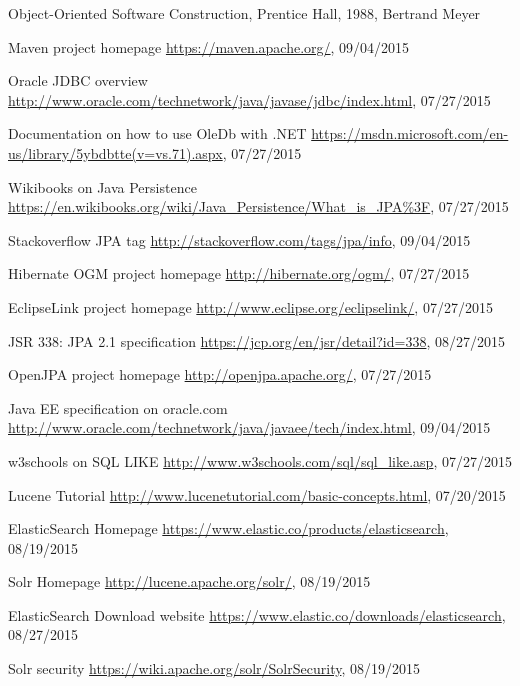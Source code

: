 \begin{thebibliography}{100}
	 Object-Oriented Software Construction, Prentice Hall, 1988, Bertrand Meyer

	 Maven project homepage
	\url{https://maven.apache.org/}, 09/04/2015

	 Oracle JDBC overview
	\url{http://www.oracle.com/technetwork/java/javase/jdbc/index.html}, 07/27/2015

	 Documentation on how to use OleDb with .NET
	\url{https://msdn.microsoft.com/en-us/library/5ybdbtte(v=vs.71).aspx}, 07/27/2015

	 Wikibooks on Java Persistence
	\url{https://en.wikibooks.org/wiki/Java_Persistence/What_is_JPA\%3F}, 07/27/2015

	 Stackoverflow JPA tag
	\url{http://stackoverflow.com/tags/jpa/info}, 09/04/2015

	 Hibernate OGM project homepage
	\url{http://hibernate.org/ogm/}, 07/27/2015

	 EclipseLink project homepage
	\url{http://www.eclipse.org/eclipselink/}, 07/27/2015

	 JSR 338: JPA 2.1 specification
	\url{https://jcp.org/en/jsr/detail?id=338}, 08/27/2015

	 OpenJPA project homepage
	\url{http://openjpa.apache.org/}, 07/27/2015

	 Java EE specification on oracle.com
	\url{http://www.oracle.com/technetwork/java/javaee/tech/index.html}, 09/04/2015

	 w3schools on SQL LIKE
	\url{http://www.w3schools.com/sql/sql_like.asp}, 07/27/2015

	 Lucene Tutorial
	\url{http://www.lucenetutorial.com/basic-concepts.html}, 07/20/2015

	 ElasticSearch Homepage
	\url{https://www.elastic.co/products/elasticsearch}, 08/19/2015

	 Solr Homepage
	\url{http://lucene.apache.org/solr/}, 08/19/2015

	 ElasticSearch Download website
	\url{https://www.elastic.co/downloads/elasticsearch}, 08/27/2015

	 Solr security
	\url{https://wiki.apache.org/solr/SolrSecurity}, 08/19/2015


\end{thebibliography}
